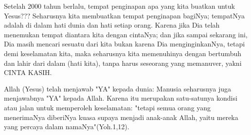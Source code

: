 Setelah 2000 tahun berlalu, tempat penginapan apa yang kita buatkan untuk Yesus??? Seharusnya kita membuatkan tempat penginapan bagiNya; tempatNya adalah di dalam hati dunia dan hati setiap orang. Karena jika Dia telah menemukan tempat diantara kita dengan cintaNya; dan jika sampai sekarang ini, Dia masih mencari sesuatu dari kita bukan karena Dia menginginkanNya, tetapi demi keselamatan kita, maka seharusnya kita memenuhinya dengan bertumbuh dan lahir dari dalam (hati kita), tanpa harus seseorang yang memanuver, yakni CINTA KASIH.	

Allah (Yesus) telah menjawab "YA" kepada dunia: Manusia seharusnya juga menjawabnya "YA" kepada Allah. Karena itu merupakan satu-satunya kondisi atau jalan untuk memperoleh keselamatan: "tetapi semua orang yang menerimaNya diberiNya kuasa supaya menjadi anak-anak Allah, yaitu mereka yang percaya dalam namaNya"(Yoh.1,12). 

\normalsize